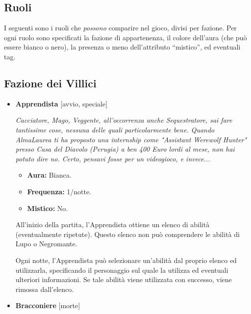 \documentclass[a4paper,10pt]{article}
\begin{document}
\subsection{Ruoli}
\label{ruoli}

I seguenti sono i ruoli che \emph{possono} comparire nel gioco, divisi per fazione. Per ogni ruolo sono specificati la fazione di appartenenza, il colore dell'aura (che può essere bianco o nero), la presenza o meno dell'attributo ``mistico'', ed eventuali tag.

\subsection*{Fazione dei Villici}

\begin{itemize}

      \item \textbf{Apprendista} [avvio, speciale]

            \emph{Cacciatore, Mago, Veggente, all'occorrenza anche Sequestratore, sai fare tantissime cose, nessuna delle quali particolarmente bene. Quando AlmaLaurea ti ha proposto una internship come "Assistant Werewolf Hunter" presso Casa del Diavolo (Perugia) a ben 400 Euro lordi al mese, non hai potuto dire no. Certo, pensavi fosse per un videogioco, e invece...}

            \begin{multicols}{3}
                  \begin{itemize}
                        \item \textbf{Aura:} Bianca.
                        \item \textbf{Frequenza:} 1/notte.
                        \item \textbf{Mistico:} No.
                  \end{itemize}
            \end{multicols}

            All'inizio della partita, l'Apprendista ottiene un elenco di abilità (eventualmente ripetute). Questo elenco non può comprendere le abilità di Lupo o Negromante.

            Ogni notte, l'Apprendista può selezionare un'abilità dal proprio elenco ed utilizzarla, specificando il personaggio sul quale la utilizza ed eventuali ulteriori informazioni. Se tale abilità viene utilizzata con successo, viene rimossa dall'elenco.

      \item \textbf{Bracconiere} [morte]


\end{itemize}
\end{document}
